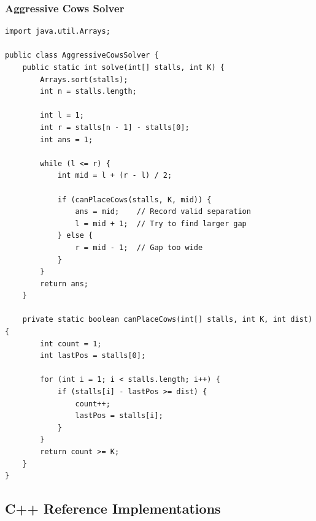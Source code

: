 \documentclass[10pt,journal,compsoc,onecolumn]{IEEEtran}
\begin{document}
\subsubsection{Aggressive Cows Solver}
{\footnotesize
\begin{verbatim}
import java.util.Arrays;

public class AggressiveCowsSolver {
    public static int solve(int[] stalls, int K) {
        Arrays.sort(stalls);
        int n = stalls.length;

        int l = 1;
        int r = stalls[n - 1] - stalls[0];
        int ans = 1;

        while (l <= r) {
            int mid = l + (r - l) / 2;

            if (canPlaceCows(stalls, K, mid)) {
                ans = mid;    // Record valid separation
                l = mid + 1;  // Try to find larger gap
            } else {
                r = mid - 1;  // Gap too wide
            }
        }
        return ans;
    }

    private static boolean canPlaceCows(int[] stalls, int K, int dist) {
        int count = 1;
        int lastPos = stalls[0];

        for (int i = 1; i < stalls.length; i++) {
            if (stalls[i] - lastPos >= dist) {
                count++;
                lastPos = stalls[i];
            }
        }
        return count >= K;
    }
}
\end{verbatim}
}

\subsection{C++ Reference Implementations}
\end{document}
